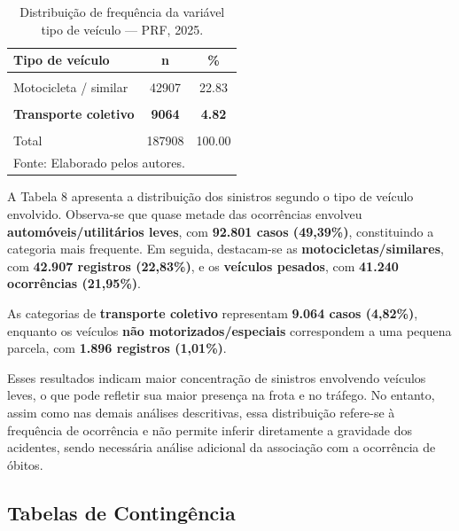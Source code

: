 \documentclass[
  brazilian,
  12pt,
]{article}
\begin{document}
\begin{longtable}[t]{lcc}
\caption{\label{tab:tab8}Distribuição de frequência da variável tipo de veículo — PRF, 2025.}\\
\toprule
Tipo de veículo & n & \%\\
\midrule
\cellcolor{gray!10}{Automóvel / utilitário leve} & \cellcolor{gray!10}{92801} & \cellcolor{gray!10}{49.39}\\
Motocicleta / similar & 42907 & 22.83\\
\cellcolor{gray!10}{Não motorizado / especial} & \cellcolor{gray!10}{1896} & \cellcolor{gray!10}{1.01}\\
\textbf{Transporte coletivo} & \textbf{9064} & \textbf{4.82}\\
\cellcolor{gray!10}{Veículo pesado} & \cellcolor{gray!10}{41240} & \cellcolor{gray!10}{21.95}\\
\addlinespace
Total & 187908 & 100.00\\
\bottomrule
\multicolumn{3}{l}{\rule{0pt}{1em}Fonte: Elaborado pelos autores.}\\
\end{longtable}
\endgroup{}

A Tabela 8 apresenta a distribuição dos sinistros segundo o tipo de
veículo envolvido. Observa-se que quase metade das ocorrências envolveu
\textbf{automóveis/utilitários leves}, com \textbf{92.801 casos
(49,39\%)}, constituindo a categoria mais frequente. Em seguida,
destacam-se as \textbf{motocicletas/similares}, com \textbf{42.907
registros (22,83\%)}, e os \textbf{veículos pesados}, com \textbf{41.240
ocorrências (21,95\%)}.

As categorias de \textbf{transporte coletivo} representam \textbf{9.064
casos (4,82\%)}, enquanto os veículos \textbf{não motorizados/especiais}
correspondem a uma pequena parcela, com \textbf{1.896 registros
(1,01\%)}.

Esses resultados indicam maior concentração de sinistros envolvendo
veículos leves, o que pode refletir sua maior presença na frota e no
tráfego. No entanto, assim como nas demais análises descritivas, essa
distribuição refere-se à frequência de ocorrência e não permite inferir
diretamente a gravidade dos acidentes, sendo necessária análise
adicional da associação com a ocorrência de óbitos.

\newpage

\subsection{Tabelas de Contingência}\label{tabelas-de-continguxeancia}
\end{document}
